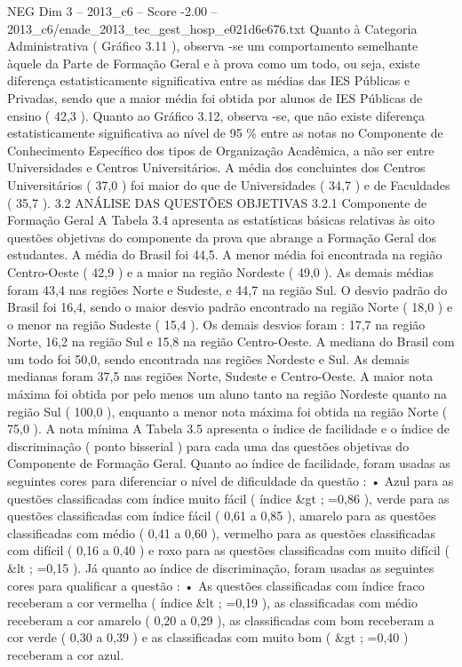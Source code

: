 \begin{textsample}{NEG Dim 3 – 2013\_c6 – Score -2.00 – 2013\_c6/enade\_2013\_tec\_gest\_hosp\_e021d6e676.txt}
Quanto à Categoria Administrativa ( Gráfico 3.11 ), observa -se um comportamento semelhante àquele da Parte de Formação Geral e à prova como um todo, ou seja, existe diferença estatisticamente significativa entre as médias das IES Públicas e Privadas, sendo que a maior média foi obtida por alunos de IES Públicas de ensino ( 42,3 ).
Quanto ao Gráfico 3.12, observa -se, que não existe diferença estatisticamente significativa ao nível de 95 \% entre as notas no Componente de Conhecimento Específico dos tipos de Organização Acadêmica, a não ser entre Universidades e Centros Universitários.
A média dos concluintes dos Centros Universitários ( 37,0 ) foi maior do que de Universidades ( 34,7 ) e de Faculdades ( 35,7 ). 3.2 ANÁLISE DAS QUESTÕES OBJETIVAS 3.2.1 Componente de Formação Geral A Tabela 3.4 apresenta as estatísticas básicas relativas às oito questões objetivas do componente da prova que abrange a Formação Geral dos estudantes.
A média do Brasil foi 44,5.
A menor média foi encontrada na região Centro-Oeste ( 42,9 ) e a maior na região Nordeste ( 49,0 ).
As demais médias foram 43,4 nas regiões Norte e Sudeste, e 44,7 na região Sul.
O desvio padrão do Brasil foi 16,4, sendo o maior desvio padrão encontrado na região Norte ( 18,0 ) e o menor na região Sudeste ( 15,4 ).
Os demais desvios foram : 17,7 na região Norte, 16,2 na região Sul e 15,8 na região Centro-Oeste.
A mediana do Brasil com um todo foi 50,0, sendo encontrada nas regiões Nordeste e Sul.
As demais medianas foram 37,5 nas regiões Norte, Sudeste e Centro-Oeste.
A maior nota máxima foi obtida por pelo menos um aluno tanto na região Nordeste quanto na região Sul ( 100,0 ), enquanto a menor nota máxima foi obtida na região Norte ( 75,0 ).
A nota mínima A Tabela 3.5 apresenta o índice de facilidade e o índice de discriminação ( ponto bisserial ) para cada uma das questões objetivas do Componente de Formação Geral.
Quanto ao índice de facilidade, foram usadas as seguintes cores para diferenciar o nível de dificuldade da questão : • Azul para as questões classificadas com índice muito fácil ( índice \&gt ; =0,86 ), verde para as questões classificadas com índice fácil ( 0,61 a 0,85 ), amarelo para as questões classificadas com médio ( 0,41 a 0,60 ), vermelho para as questões classificadas com difícil ( 0,16 a 0,40 ) e roxo para as questões classificadas com muito difícil ( \&lt ; =0,15 ).
Já quanto ao índice de discriminação, foram usadas as seguintes cores para qualificar a questão : • As questões classificadas com índice fraco receberam a cor vermelha ( índice \&lt ; =0,19 ), as classificadas com médio receberam a cor amarelo ( 0,20 a 0,29 ), as classificadas com bom receberam a cor verde ( 0,30 a 0,39 ) e as classificadas com muito bom ( \&gt ; =0,40 ) receberam a cor azul.

\end{textsample}
